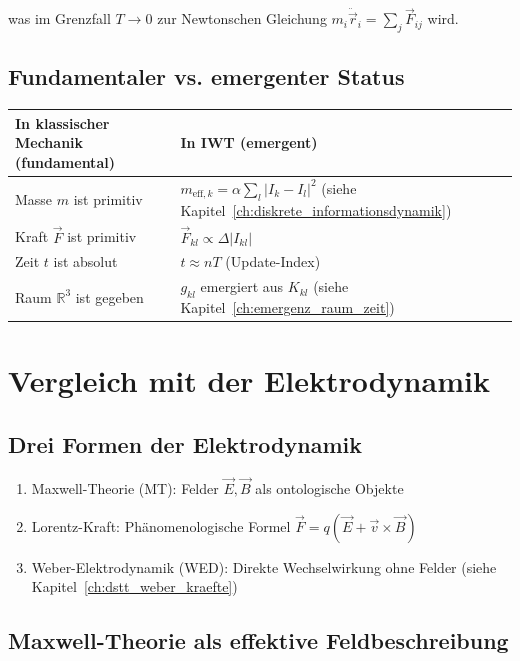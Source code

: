 was im Grenzfall \( T \to 0 \) zur Newtonschen Gleichung \( m_i \ddot{\vec{r}}_i = \sum_j \vec{F}_{ij} \) wird.

\subsection{Fundamentaler vs. emergenter Status}
\label{sub:vergleich_klassisch_status}

\begin{tabular}{|l|l|}
\hline
\textbf{In klassischer Mechanik (fundamental)} & \textbf{In IWT (emergent)} \\
\hline
Masse \( m \) ist primitiv & \( m_{\text{eff},k} = \alpha \sum_l |I_k - I_l|^2 \) (siehe Kapitel~\ref{ch:diskrete_informationsdynamik}) \\
Kraft \( \vec{F} \) ist primitiv & \( \vec{F}_{kl} \propto \Delta |I_{kl}| \) \\
Zeit \( t \) ist absolut & \( t \approx nT \) (Update-Index) \\
Raum \( \mathbb{R}^3 \) ist gegeben & \( g_{kl} \) emergiert aus \( K_{kl} \) (siehe Kapitel~\ref{ch:emergenz_raum_zeit}) \\
\hline
\end{tabular}

\section{Vergleich mit der Elektrodynamik}
\label{app:vergleich_elektrodynamik}

\subsection{Drei Formen der Elektrodynamik}
\label{sub:vergleich_elektro_formen}

\begin{enumerate}
    \item Maxwell-Theorie (MT): Felder \( \vec{E}, \vec{B} \) als ontologische Objekte
    \item Lorentz-Kraft: Phänomenologische Formel \( \vec{F} = q(\vec{E} + \vec{v} \times \vec{B}) \)
    \item Weber-Elektrodynamik (WED): Direkte Wechselwirkung ohne Felder (siehe Kapitel~\ref{ch:dstt_weber_kraefte})
\end{enumerate}

\subsection{Maxwell-Theorie als effektive Feldbeschreibung}
\label{sub:vergleich_elektro_maxwell}

